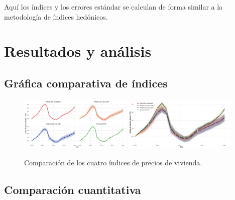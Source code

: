 \documentclass[conference]{IEEEtran}
\begin{document}
Aquí los índices y los errores estándar se calculan de forma similar a la metodología de índices hedónicos.

\section{Resultados y análisis}

\subsection{Gráfica comparativa de índices}

\begin{figure}[H]
  \centering
  \includegraphics[width=0.48\textwidth]{../figures/grafica1.png}
  \includegraphics[width=0.48\textwidth]{../figures/grafica2.png}
  \caption{Comparación de los cuatro índices de precios de vivienda.}
  \label{fig:indices_comparacion}
\end{figure}

\subsection{Comparación cuantitativa}
\end{document}
